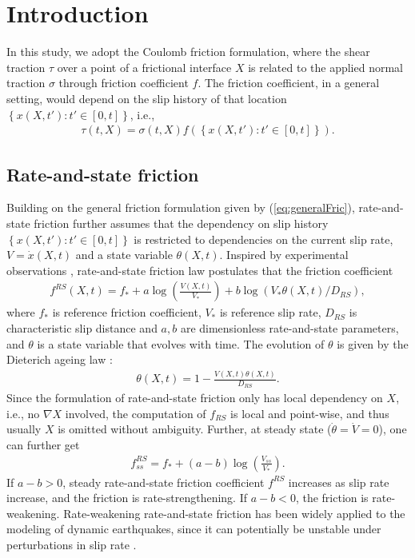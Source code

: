 \section{Introduction}
\label{sec:introduction}

In this study, 
we adopt the Coulomb friction formulation, 
where the shear traction $\tau$ over a point of a frictional interface $X$ is related to the applied normal traction $\sigma$ through friction coefficient $f$. 
The friction coefficient, 
in a general setting, 
would depend on the slip history of that location $\left\{x(X, t') : t' \in [0, t]\right\}$, i.e., 
\begin{align}
    \tau(t, X) = \sigma(t, X) f\left(\left\{x(X, t') : t' \in [0, t]\right\}\right) \label{eq:generalFric}. 
\end{align}

\subsection{Rate-and-state friction}
Building on the general friction formulation given by (\ref{eq:generalFric}), 
rate-and-state friction further assumes that the dependency on slip history $\left\{x(X, t') : t' \in [0, t]\right\}$ is restricted to dependencies on the current slip rate, 
$V = \dot{x}(X, t)$ and a state variable $\theta(X, t)$. 
Inspired by experimental observations \cite{dieterich_modeling_1979, marone_laboratory-derived_1998, ruina_slip_1983}, 
rate-and-state friction law postulates that the friction coefficient 
\begin{align}
    f^{RS}(X, t) = f_* + a \log\left(\frac{V(X, t)}{V_*}\right) + b \log\left(V_* \theta(X, t) /D_{RS}\right) \label{eq:fRS}, 
\end{align}
where $f_*$ is reference friction coefficient, 
$V_*$ is reference slip rate, 
$D_{RS}$ is characteristic slip distance and $a, b$ are dimensionless rate-and-state parameters, 
and $\theta$ is a state variable that evolves with time. 
The evolution of $\theta$ is given by the Dieterich ageing law \cite{dieterich_modeling_1979, ruina_slip_1983}:
\begin{align}
    \theta(X, t) = 1 - \frac{V(X, t) \theta(X, t)}{D_{RS}} \label{eq:AgeingLaw}. 
\end{align}
Since the formulation of rate-and-state friction only has local dependency on $X$, 
i.e., no $\nabla X$ involved, 
the computation of $f_{RS}$ is local and point-wise, 
and thus usually $X$ is omitted without ambiguity. 
Further, 
at steady state ($\dot{\theta} = \dot{V} = 0$), 
one can further get 
\begin{align}
    f_{ss}^{RS} = f_* + (a - b) \log \left(\frac{V_{ss}}{V_*}\right) \label{eq:fRSss}. 
\end{align}
If $a - b > 0$, 
steady rate-and-state friction coefficient $f^{RS}$ increases as slip rate increase, 
and the friction is rate-strengthening. 
If $a - b < 0$, 
the friction is rate-weakening. 
Rate-weakening rate-and-state friction has been widely applied to the modeling of dynamic earthquakes, 
since it can potentially be unstable under perturbations in slip rate \cite{dieterich_modeling_1979, 
 marone_laboratory-derived_1998, ruina_slip_1983,rice_stability_1983, scholz_2019}. 

